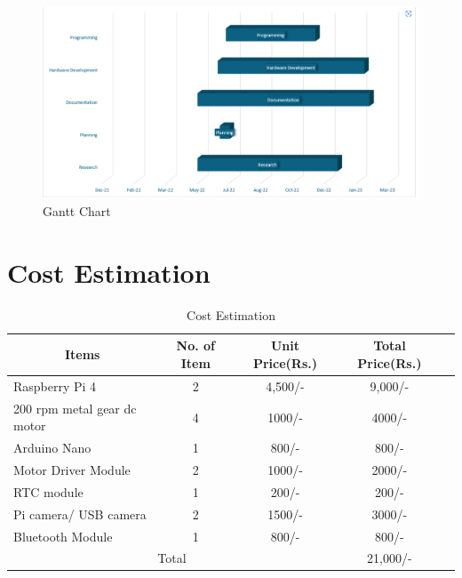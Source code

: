 \begin{figure}[H] %
\begin{center}
	\includegraphics[width = 7in]{images/ganttchart.png}
	\caption{Gantt Chart} %
	\label{figSample1} %
\end{center}
\end{figure}

\section{Cost Estimation}

\begin{table}[H]
\centering
\begin{tabular}{|l|c|c|c|c|} %
	\hline %
	\multicolumn{1}{|c|}{Items}  &No. of Item &Unit Price(Rs.) &Total Price(Rs.)\\
	\hline %
	Raspberry Pi 4 &2 &4,500/- &9,000/-\\
	\hline %
	200 rpm metal gear dc motor &4 &1000/- &4000/-\\
	\hline
	Arduino Nano &1 &800/- &800/-\\
	\hline
	Motor Driver Module &2 &1000/- &2000/-\\
	\hline
	RTC module &1 &200/- &200/-\\
	\hline
	Pi camera/ USB camera &2 &1500/- &3000/-\\
	\hline
	Bluetooth Module &1 &800/- &800/-\\
	\hline
	\multicolumn{3}{|c|}{Total} &21,000/-\\
	\hline
\end{tabular}

\caption{Cost Estimation}

\label{tblCostEstimationTable}
\end{table}


